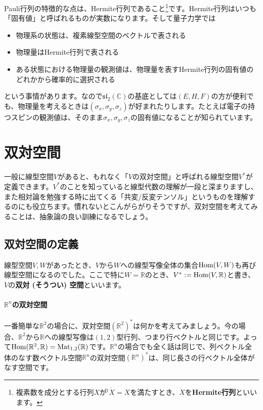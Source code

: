 Pauli行列の特徴的な点は、Hermite行列であること\footnote{複素数を成分とする行列$X$が$\overline{{}^tX} = X$を満たすとき、$X$を\textbf{Hermite行列}といいます。}です。Hermite行列はいつも「固有値」と呼ばれるものが実数になります。そして量子力学では
\begin{itemize}
\item 物理系の状態は、複素線型空間のベクトルで表される
\item 物理量はHermite行列で表される
\item ある状態における物理量の観測値は、物理量を表すHermite行列の固有値のどれかから確率的に選択される
\end{itemize}
という事情があります。なので$\mathfrak{sl}_2(\mathbb{C})$の基底としては$(E, H, F)$の方が便利でも、物理量を考えるときは$(\sigma_x, \sigma_y, \sigma_z)$が好まれたりします。たとえば電子の持つスピンの観測値は、そのまま$\sigma_x, \sigma_y, \sigma_z$の固有値になることが知られています。

\section{双対空間}

一般に線型空間$V$があると、もれなく「$V$の双対空間」と呼ばれる線型空間$V^*$が定義できます。$V^*$のことを知っていると線型代数の理解が一段と深まりますし、また相対論を勉強する時に出てくる「共変/反変テンソル」というものを理解するのにも役立ちます。慣れないとこんがらがりそうですが、双対空間を考えてみることは、抽象論の良い訓練になるでしょう。

\subsection{双対空間の定義}

線型空間$V, W$があったとき、$V$から$W$への線型写像全体の集合$\operatorname{Hom}(V, W)$も再び線型空間になるのでした。ここで特に$W = \mathbb{R}$のとき、$V^* := \operatorname{Hom}(V, \mathbb{R})$と書き、$V$の\textbf{双対 (そうつい) 空間}といいます。

\paragraph{$\mathbb{R}^n$の双対空間} 一番簡単な$\mathbb{R}^2$の場合に、双対空間$(\mathbb{R}^2)^*$は何かを考えてみましょう。今の場合、$\mathbb{R}^2$から$\mathbb{R}$への線型写像は$(1, 2)$型行列、つまり行ベクトルと同じです。よって$\operatorname{Hom}(\mathbb{R}^2, \mathbb{R}) = \operatorname{Mat}_{1, 2}(\mathbb{R})$です。$\mathbb{R}^n$の場合でも全く話は同じで、列ベクトル全体のなす数ベクトル空間$\mathbb{R}^n$の双対空間$(\mathbb{R}^n)^*$は、同じ長さの行ベクトル全体がなす空間です。

